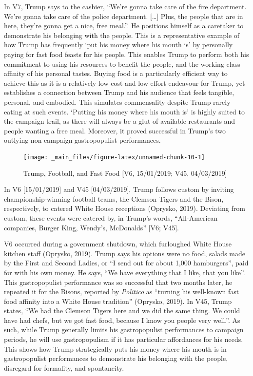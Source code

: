 \documentclass[a4paper, nobind]{templates/ociamthesis}
\begin{document}
In V7, Trump says to the cashier, ``We're gonna take care of the fire department. We're gonna take care of the police department. {[}\ldots{]} Plus, the people that are in here, they're gonna get a nice, free meal.''. He positions himself as a caretaker to demonstrate his belonging with the people. This is a representative example of how Trump has frequently `put his money where his mouth is' by personally paying for fast food feasts for his people. This enables Trump to perform both his commitment to using his resources to benefit the people, and the working class affinity of his personal tastes. Buying food is a particularly efficient way to achieve this as it is a relatively low-cost and low-effort endeavour for Trump, yet establishes a connection between Trump and his audience that feels tangible, personal, and embodied. This simulates commensality despite Trump rarely eating at such events. `Putting his money where his mouth is' is highly suited to the campaign trail, as there will always be a glut of available restaurants and people wanting a free meal. Moreover, it proved successful in Trump's two outlying non-campaign gastropopulist performances.

\begin{figure}
\texttt{[image: \_main\_files/figure-latex/unnamed-chunk-10-1]} \caption{Trump, Football, and Fast Food [V6, 15/01/2019; V45, 04/03/2019]}\label{fig:unnamed-chunk-10}
\end{figure}

In V6 {[}15/01/2019{]} and V45 {[}04/03/2019{]}, Trump follows custom by inviting championship-winning football teams, the Clemson Tigers and the Bison, respectively, to catered White House receptions (Oprysko, 2019). Deviating from custom, these events were catered by, in Trump's words, ``All-American companies, Burger King, Wendy's, McDonalds'' {[}V6; V45{]}.

V6 occurred during a government shutdown, which furloughed White House kitchen staff (Oprysko, 2019). Trump says his options were no food, salads made by the First and Second Ladies, or ``I send out for about 1,000 hamburgers'', paid for with his own money. He says, ``We have everything that I like, that you like''. This gastropopulist performance was so successful that two months later, he repeated it for the Bisons, reported by \emph{Politico} as ``turning his well-known fast food affinity into a White House tradition'' (Oprysko, 2019). In V45, Trump states, ``We had the Clemson Tigers here and we did the same thing. We could have had chefs, but we got fast food, because I know you people very well.''. As such, while Trump generally limits his gastropopulist performances to campaign periods, he will use gastropopulism if it has particular affordances for his needs. This shows how Trump strategically puts his money where his mouth is in gastropopulist performances to demonstrate his belonging with the people, disregard for formality, and spontaneity.
\end{document}
